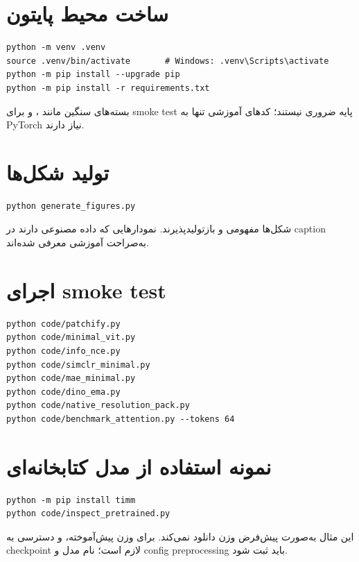 \documentclass[12pt,openany,oneside]{book}
\begin{document}
\section{ساخت محیط پایتون}
\begin{latin}
\begin{lstlisting}
python -m venv .venv
source .venv/bin/activate       # Windows: .venv\Scripts\activate
python -m pip install --upgrade pip
python -m pip install -r requirements.txt
\end{lstlisting}
\end{latin}
بسته‌های سنگین مانند ،  و  برای smoke test پایه ضروری نیستند؛ کدهای آموزشی تنها به PyTorch نیاز دارند.

\section{تولید شکل‌ها}
\begin{latin}
\begin{lstlisting}
python generate_figures.py
\end{lstlisting}
\end{latin}
شکل‌ها مفهومی و بازتولیدپذیرند. نمودارهایی که داده مصنوعی دارند در caption به‌صراحت آموزشی معرفی شده‌اند.

\section{اجرای smoke test}
\begin{latin}
\begin{lstlisting}
python code/patchify.py
python code/minimal_vit.py
python code/info_nce.py
python code/simclr_minimal.py
python code/mae_minimal.py
python code/dino_ema.py
python code/native_resolution_pack.py
python code/benchmark_attention.py --tokens 64
\end{lstlisting}
\end{latin}

\section{نمونه استفاده از مدل کتابخانه‌ای}
\begin{latin}
\begin{lstlisting}
python -m pip install timm
python code/inspect_pretrained.py
\end{lstlisting}
\end{latin}
این مثال به‌صورت پیش‌فرض وزن دانلود نمی‌کند. برای وزن پیش‌آموخته،  و دسترسی به checkpoint لازم است؛ نام مدل و config preprocessing باید ثبت شود.
\end{document}
